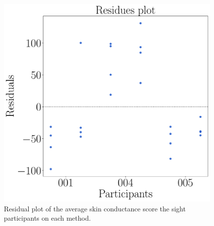 \begin{figure}[!htb]
    \begin{minipage}{0.45\textwidth}
        \centering
        \includegraphics[width = \textwidth]{Resultados/GSR/Figuras/pdf/residplot_gsr_two_way_sight.pdf}
        \caption{Residual plot of the average skin conductance score the sight participants on each method.}
        \label{fig:residplot_gsr_two_way_sight}
    \end{minipage}
\end{figure}

\FloatBarrier